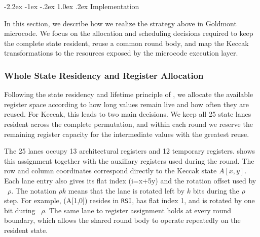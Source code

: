 \documentclass[journal=tches,submission]{iacrtrans}
\makeatletter
\newcommand{\code}[1]{\texttt{#1}}
\renewcommand\subsection{\@startsection{subsection}{2}{\z@}%
      {-2.2ex \@plus -1ex \@minus -.2ex}%
      {1.0ex \@plus .2ex}%
      {\normalfont\large\bfseries\SS@subsectfont}}
\makeatother
\begin{document}
\subsection{Implementation}

In this section, we describe how we realize the strategy above in Goldmont microcode. 
We focus on the allocation and scheduling decisions required to keep the complete state resident, reuse a common round body, and map the Keccak transformations to the resources exposed by the microcode execution layer.

\subsubsection{Whole State Residency and Register Allocation}
\label{sec:residency}

Following the state residency and lifetime principle of , we allocate the available register space according to how long values remain live and how often they are reused. 
For Keccak, this leads to two main decisions. 
We keep all 25 state lanes resident across the complete permutation, and within each round we reserve the remaining register capacity for the intermediate values with the greatest reuse.

The 25 lanes occupy 13 architectural registers and 12 temporary registers. 
 shows this assignment together with the auxiliary registers used during the round. 
The row and column coordinates correspond directly to the Keccak state $A[x,y]$. 
Each lane entry also gives its flat index (i=x+5y) and the rotation offset used by ~$\rho$. 
The notation $\rho k$ means that the lane is rotated left by $k$ bits during the $\rho$ step. 
For example, (A[1,0]) resides in \code{RSI}, has flat index 1, and is rotated by one bit during ~$\rho$. 
The same lane to register assignment holds at every round boundary, which allows the shared round body to operate repeatedly on the resident state.
\end{document}
